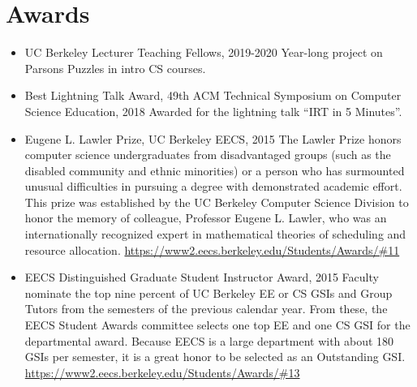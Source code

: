 \section{Awards}
\vspace{6pt}

\begin{itemize}

  \setlength\itemsep{1em}

    \item UC Berkeley Lecturer Teaching Fellows, 2019-2020
    \vspace{2pt}
    \newline\small Year-long project on Parsons Puzzles in intro CS courses.
    \vspace{2pt}
    
    \item Best Lightning Talk Award, 49th ACM Technical Symposium on Computer Science Education, 2018
    \vspace{2pt}
    \newline\small Awarded for the lightning talk ``IRT in 5 Minutes''.
    \vspace{2pt}

    \item Eugene L. Lawler Prize, UC Berkeley EECS, 2015
    \vspace{2pt}
    \newline\small{The Lawler Prize honors computer science undergraduates from disadvantaged groups (such as the disabled community and ethnic minorities) or a person who has surmounted unusual difficulties in pursuing a degree with demonstrated academic effort. This prize was established by the UC Berkeley Computer Science Division to honor the memory of colleague, Professor Eugene L. Lawler, who was an internationally recognized expert in mathematical theories of scheduling and resource allocation.}
    \vspace{2pt}
    \small \href{https://www2.eecs.berkeley.edu/Students/Awards/\#11}{https://www2.eecs.berkeley.edu/Students/Awards/\#11}
    
    \item EECS Distinguished Graduate Student Instructor Award, 2015
    \vspace{2pt}
    \newline
    \small{Faculty nominate the top nine percent of UC Berkeley EE or CS GSIs and Group Tutors from the semesters of the previous calendar year. From these, the EECS Student Awards committee selects one top EE and one CS GSI for the departmental award. Because EECS is a large department with about 180 GSIs per semester, it is a great honor to be selected as an Outstanding GSI.}
    \vspace{2pt}
    \small\href{https://www2.eecs.berkeley.edu/Students/Awards/\#13}{https://www2.eecs.berkeley.edu/Students/Awards/\#13}

\end{itemize}

